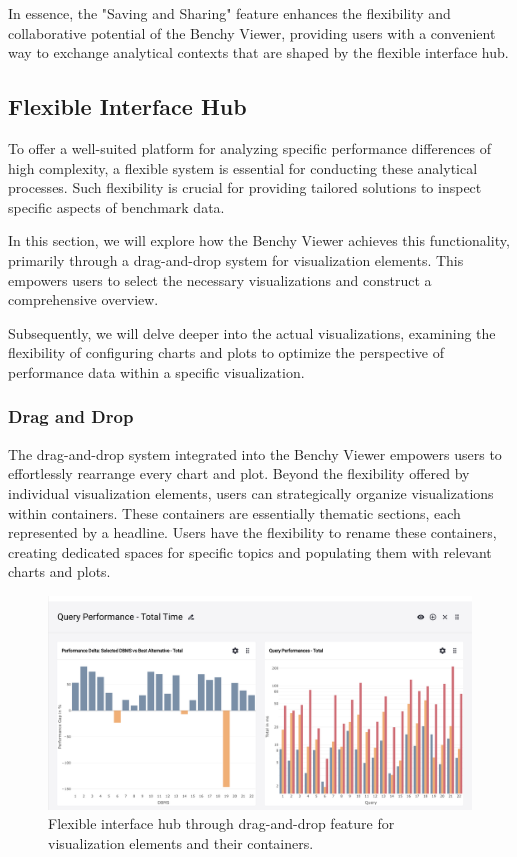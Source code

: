 In essence, the "Saving and Sharing" feature enhances the flexibility and collaborative potential of the Benchy Viewer, providing users with a convenient way to exchange analytical contexts that are shaped by the flexible interface hub.



\subsection{Flexible Interface Hub}

To offer a well-suited platform for analyzing specific performance differences of high complexity, a flexible system is essential for conducting these analytical processes. Such flexibility is crucial for providing tailored solutions to inspect specific aspects of benchmark data.

In this section, we will explore how the Benchy Viewer achieves this functionality, primarily through a drag-and-drop system for visualization elements. This empowers users to select the necessary visualizations and construct a comprehensive overview.

Subsequently, we will delve deeper into the actual visualizations, examining the flexibility of configuring charts and plots to optimize the perspective of performance data within a specific visualization.

\subsubsection{Drag and Drop}
The drag-and-drop system integrated into the Benchy Viewer empowers users to effortlessly rearrange every chart and plot. Beyond the flexibility offered by individual visualization elements, users can strategically organize visualizations within containers. These containers are essentially thematic sections, each represented by a headline. Users have the flexibility to rename these containers, creating dedicated spaces for specific topics and populating them with relevant charts and plots.

\begin{figure}[h]
  \centering
  \includegraphics[width=0.8\linewidth]{figures/analytics-drag-and-drop.png}
  \caption{Flexible interface hub through drag-and-drop feature for visualization elements and their containers.}
  \label{fig:analytics-drag-and-drop}
\end{figure}

